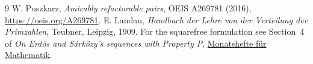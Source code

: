 \documentclass[11pt]{article}
\begin{document}
\begin{thebibliography}{9}
 W. Puszkarz, \emph{Amicably refactorable pairs}, OEIS A269781 (2016), \url{https://oeis.org/A269781}.
 E. Landau, \emph{Handbuch der Lehre von der Verteilung der Primzahlen}, Teubner, Leipzig, 1909. For the squarefree formulation see Section~4 of \emph{On Erd\H{o}s and S\'ark\"ozy's sequences with Property P}, \href{https://doi.org/10.1007/s00605-016-0995-9}{Monatshefte f\"ur Mathematik}.
\end{thebibliography}
\end{document}
